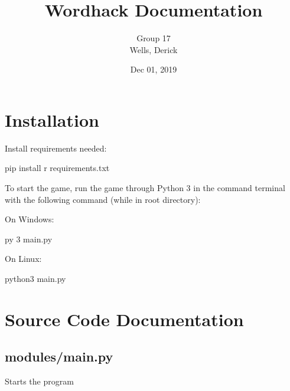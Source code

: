 \documentclass[letterpaper,10pt,english]{sphinxmanual}
\title{Wordhack Documentation}
\date{Dec 01, 2019}
\author{Group 17 \\ Wells, Derick}
\begin{document}
\pagestyle{empty}
\maketitle
\pagestyle{plain}
\sphinxtableofcontents
\pagestyle{normal}
\label{\detokenize{index::doc}}



\chapter{Installation}
\label{\detokenize{index:installation}}

Install requirements needed:

%
\begin{sphinxVerbatim}[commandchars=\\\{\}]
pip install \PYGZhy{}r requirements.txt
\end{sphinxVerbatim}

To start the game, run the game through Python 3 in the command terminal
with the following command (while in root directory):

On Windows:

%
\begin{sphinxVerbatim}[commandchars=\\\{\}]
py \PYGZhy{}3 main.py
\end{sphinxVerbatim}

On Linux:

%
\begin{sphinxVerbatim}[commandchars=\\\{\}]
python3 main.py
\end{sphinxVerbatim}


\chapter{Source Code Documentation}
\label{\detokenize{index:source-code-documentation}}

\section{modules/main.py}
\label{\detokenize{index:modules-main-py}}

\begin{fulllineitems}
Starts the program

\end{fulllineitems}
\end{document}
